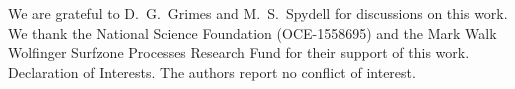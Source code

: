 \documentclass{jfm}
\begin{document}
\begin{acknowledgements}
We are grateful to D.~G.~Grimes and M.~S.~Spydell for discussions on
this work.
We thank the National Science Foundation (OCE-1558695) and the Mark Walk
Wolfinger Surfzone Processes Research Fund for their support of this
work.
Declaration of Interests. The authors report no conflict of interest.
\end{acknowledgements}



\end{document}
